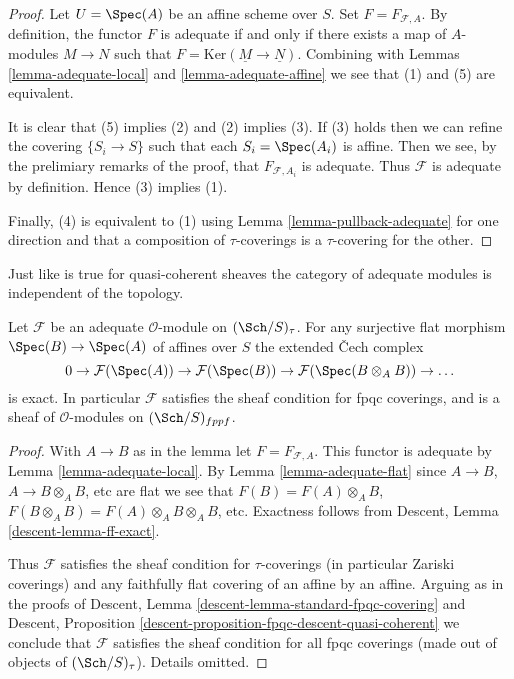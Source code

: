 \begin{proof}
Let $U = \Spec(A)$ be an affine scheme over $S$.
Set $F = F_{\mathcal{F}, A}$. By definition, the functor
$F$ is adequate if and only if there exists a map of $A$-modules
$M \to N$ such that $F = \text{Ker}(\underline{M} \to \underline{N})$.
Combining with
Lemmas \ref{lemma-adequate-local} and
\ref{lemma-adequate-affine}
we see that (1) and (5) are equivalent.

\medskip\noindent
It is clear that (5) implies (2) and (2) implies (3).
If (3) holds then we can refine the covering
$\{S_i \to S\}$ such that each $S_i = \Spec(A_i)$ is affine.
Then we see, by the prelimiary remarks of the proof, that
$F_{\mathcal{F}, A_i}$ is adequate. Thus $\mathcal{F}$
is adequate by definition. Hence (3) implies (1).

\medskip\noindent
Finally, (4) is equivalent to (1) using
Lemma \ref{lemma-pullback-adequate}
for one direction and that
a composition of $\tau$-coverings is a $\tau$-covering for the other.
\end{proof}

\noindent
Just like is true for quasi-coherent sheaves the category of
adequate modules is independent of the topology.

\begin{lemma}
\label{lemma-adequate-fpqc}
Let $\mathcal{F}$ be an adequate $\mathcal{O}$-module on
$(\Sch/S)_\tau$. For any surjective flat morphism
$\Spec(B) \to \Spec(A)$ of affines over $S$
the extended {\v C}ech complex
$$
0 \to \mathcal{F}(\Spec(A)) \to
\mathcal{F}(\Spec(B)) \to
\mathcal{F}(\Spec(B \otimes_A B)) \to \ldots
$$
is exact. In particular $\mathcal{F}$ satisfies the sheaf condition
for fpqc coverings, and is a sheaf of $\mathcal{O}$-modules
on $(\Sch/S)_{fppf}$.
\end{lemma}

\begin{proof}
With $A \to B$ as in the lemma let $F = F_{\mathcal{F}, A}$. This functor
is adequate by
Lemma \ref{lemma-adequate-local}.
By
Lemma \ref{lemma-adequate-flat}
since $A \to B$, $A \to B \otimes_A B$, etc are flat we see that
$F(B) = F(A) \otimes_A B$,
$F(B \otimes_A B) = F(A) \otimes_A B \otimes_A B$, etc.
Exactness follows from
Descent, Lemma \ref{descent-lemma-ff-exact}.

\medskip\noindent
Thus $\mathcal{F}$ satisfies the sheaf condition for
$\tau$-coverings (in particular Zariski coverings) and any faithfully
flat covering of an affine by an affine. Arguing as in the proofs of
Descent, Lemma \ref{descent-lemma-standard-fpqc-covering}
and
Descent, Proposition \ref{descent-proposition-fpqc-descent-quasi-coherent}
we conclude that $\mathcal{F}$ satisfies the sheaf condition for all
fpqc coverings (made out of objects of $(\Sch/S)_\tau$).
Details omitted.
\end{proof}

